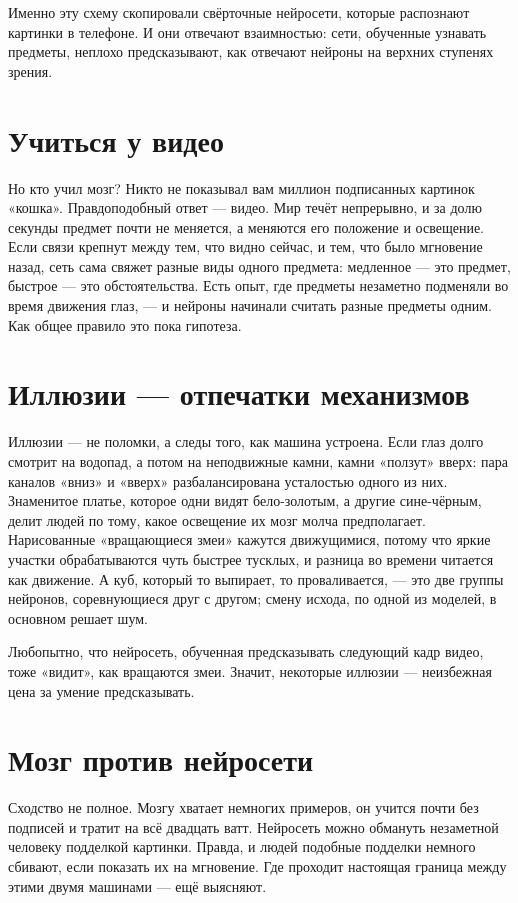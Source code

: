Именно эту схему скопировали свёрточные нейросети, которые распознают картинки в телефоне. И они отвечают взаимностью: сети, обученные узнавать предметы, неплохо предсказывают, как отвечают нейроны на верхних ступенях зрения.

\section*{Учиться у видео}

Но кто учил мозг? Никто не показывал вам миллион подписанных картинок «кошка». Правдоподобный ответ --- видео. Мир течёт непрерывно, и за долю секунды предмет почти не меняется, а меняются его положение и освещение. Если связи крепнут между тем, что видно сейчас, и тем, что было мгновение назад, сеть сама свяжет разные виды одного предмета: медленное --- это предмет, быстрое --- это обстоятельства. Есть опыт, где предметы незаметно подменяли во время движения глаз, --- и нейроны начинали считать разные предметы одним. Как общее правило это пока гипотеза.

\section*{Иллюзии --- отпечатки механизмов}

Иллюзии --- не поломки, а следы того, как машина устроена. Если глаз долго смотрит на водопад, а потом на неподвижные камни, камни «ползут» вверх: пара каналов «вниз» и «вверх» разбалансирована усталостью одного из них. Знаменитое платье, которое одни видят бело-золотым, а другие сине-чёрным, делит людей по тому, какое освещение их мозг молча предполагает. Нарисованные «вращающиеся змеи» кажутся движущимися, потому что яркие участки обрабатываются чуть быстрее тусклых, и разница во времени читается как движение. А куб, который то выпирает, то проваливается, --- это две группы нейронов, соревнующиеся друг с другом; смену исхода, по одной из моделей, в основном решает шум.

Любопытно, что нейросеть, обученная предсказывать следующий кадр видео, тоже «видит», как вращаются змеи. Значит, некоторые иллюзии --- неизбежная цена за умение предсказывать.

\section*{Мозг против нейросети}

Сходство не полное. Мозгу хватает немногих примеров, он учится почти без подписей и тратит на всё двадцать ватт. Нейросеть можно обмануть незаметной человеку подделкой картинки. Правда, и людей подобные подделки немного сбивают, если показать их на мгновение. Где проходит настоящая граница между этими двумя машинами --- ещё выясняют.


